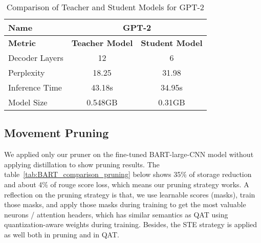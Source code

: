 \begin{table}[h!]
    \centering
    \begin{tabular}{lcc}
        \toprule
        \textbf{Name}         & \multicolumn{2}{c}{\textbf{GPT-2}} \\ \midrule
        \textbf{Metric}       & \textbf{Teacher Model} & \textbf{Student Model} \\ \midrule
        Decoder Layers        & 12                     & 6                     \\
        Perplexity            & 18.25                  & 31.98                  \\
        Inference Time        & 43.18s                 & 34.95s                 \\
        Model Size            & 0.548GB                & 0.31GB                 \\ \bottomrule
    \end{tabular}
    \caption{Comparison of Teacher and Student Models for GPT-2}
    \label{tab:gpt2_comparison}
\end{table}

\subsection{Movement Pruning}
We applied only our pruner on the fine-tuned BART-large-CNN model without applying distillation to show pruning results. The table~\ref{tab:BART_comparison_pruning} below shows 35\% of storage reduction and about 4\% of rouge score loss, which means our pruning strategy works. A reflection on the pruning strategy is that, we use learnable scores (masks), train those masks, and apply those masks during training to get the most valuable neurons / attention headers, which has similar semantics as QAT using quantization-aware weights during training. Besides, the STE strategy is applied as well both in pruning and in QAT.


